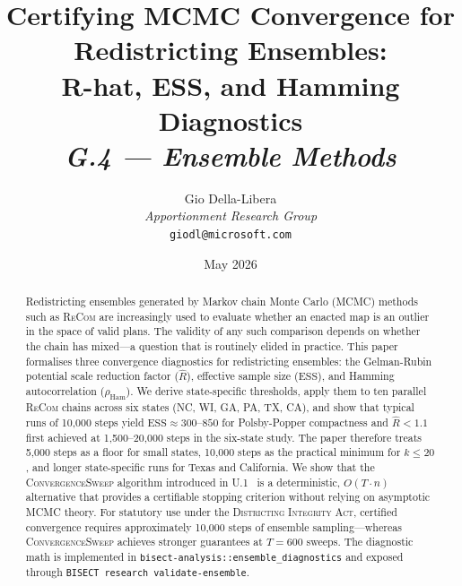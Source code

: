\documentclass[12pt]{article}
\title{%
  \textbf{Certifying MCMC Convergence for Redistricting Ensembles:}\\
  \textbf{R-hat, ESS, and Hamming Diagnostics}\\[0.8em]
  \normalsize\textit{G.4 --- Ensemble Methods}%
}
\author{%
  Gio Della-Libera\\
  \textit{Apportionment Research Group}\\
  \small\texttt{giodl@microsoft.com}
}
\date{May 2026}
\newcommand{\rhat}{\ensuremath{\hat{R}}}
\newcommand{\ess}{\ensuremath{\mathrm{ESS}}}
\newcommand{\ham}{\ensuremath{\rho_{\mathrm{Ham}}}}
\newcommand{\recom}{\textsc{ReCom}}
\newcommand{\cs}{\textsc{ConvergenceSweep}}
\newcommand{\dia}{\textsc{Districting Integrity Act}}
\begin{document}
\maketitle

\begin{abstract}
\noindent
Redistricting ensembles generated by Markov chain Monte Carlo (MCMC)
methods such as \recom{} are increasingly used to evaluate whether an
enacted map is an outlier in the space of valid plans.
The validity of any such comparison depends on whether the chain has
mixed---a question that is routinely elided in practice.
This paper formalises three convergence diagnostics for redistricting
ensembles: the Gelman-Rubin potential scale reduction factor ($\rhat$),
effective sample size (\ess{}), and Hamming autocorrelation ($\ham$).
We derive state-specific thresholds, apply them to ten parallel \recom{}
chains across six states (NC, WI, GA, PA, TX, CA), and show that typical
runs of 10{,}000 steps yield $\ess{} \approx 300$--$850$ for
Polsby-Popper compactness and $\rhat < 1.1$ first achieved at
1{,}500--20{,}000 steps in the six-state study. The paper therefore treats
5{,}000 steps as a floor for small states, 10{,}000 steps as the practical
minimum for $k \leq 20$, and longer state-specific runs for Texas and
California.
We show that the \cs{} algorithm introduced in U.1~\citep{b16paper}
is a deterministic, $O(T \cdot n)$ alternative that provides a
certifiable stopping criterion without relying on asymptotic MCMC theory.
For statutory use under the \dia{}, certified convergence requires
approximately 10{,}000 steps of ensemble sampling---whereas \cs{}
achieves stronger guarantees at $T = 600$ sweeps.
The diagnostic math is implemented in
\texttt{bisect-analysis::ensemble\_diagnostics} and exposed through
\texttt{BISECT research validate-ensemble}.
\end{abstract}

\tableofcontents
\newpage












\end{document}
